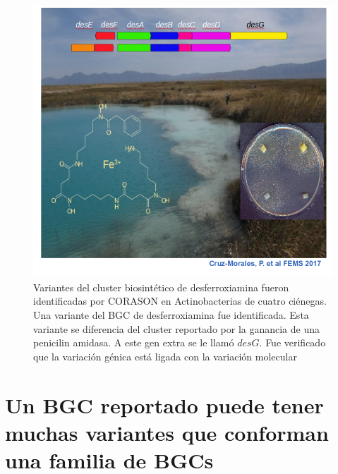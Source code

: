\documentclass[12pt,twoside]{reedthesis}
\begin{document}
  \begin{figure}[h!tbp]
  \centering
  \includegraphics[angle = 0,scale = .4]{chapter3/des.png}
  \caption[EvoMining Algorithm]{\footnotesize{Variantes del cluster biosintético de desferroxiamina fueron identificadas por CORASON en Actinobacterias de cuatro ciénegas. Una variante del BGC de desferroxiamina fue identificada. Esta variante se diferencia del cluster reportado por la ganancia de una penicilin amidasa. A este gen extra se le llamó $desG$. Fue verificado que la variación génica está ligada con la variación molecular}}
  \label{fig:des}
  \end{figure}
  
  \section{Un BGC reportado puede tener muchas variantes que conforman una
  familia de
  BGCs}\label{un-bgc-reportado-puede-tener-muchas-variantes-que-conforman-una-familia-de-bgcs}
  
\end{document}
